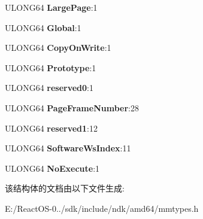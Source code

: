 \begin{DoxyCompactItemize}
U\+L\+O\+N\+G64 {\bfseries Large\+Page}\+:1
\item 
\mbox{\label{struct___h_a_r_d_w_a_r_e___p_t_e_ad8338907d10d3f0af79db8cd8588b9ef}} 
U\+L\+O\+N\+G64 {\bfseries Global}\+:1
\item 
\mbox{\label{struct___h_a_r_d_w_a_r_e___p_t_e_af6295815db74a2336e9915fe3067b23a}} 
U\+L\+O\+N\+G64 {\bfseries Copy\+On\+Write}\+:1
\item 
\mbox{\label{struct___h_a_r_d_w_a_r_e___p_t_e_adc0650db62e17a9f49a019897c7eb63b}} 
U\+L\+O\+N\+G64 {\bfseries Prototype}\+:1
\item 
\mbox{\label{struct___h_a_r_d_w_a_r_e___p_t_e_a4d9d87aa19f85084099858809b924767}} 
U\+L\+O\+N\+G64 {\bfseries reserved0}\+:1
\item 
\mbox{\label{struct___h_a_r_d_w_a_r_e___p_t_e_a9b4876b54ff1c9a5da0b5c8166dc3276}} 
U\+L\+O\+N\+G64 {\bfseries Page\+Frame\+Number}\+:28
\item 
\mbox{\label{struct___h_a_r_d_w_a_r_e___p_t_e_aae1849118a9af86e610a379231decf78}} 
U\+L\+O\+N\+G64 {\bfseries reserved1}\+:12
\item 
\mbox{\label{struct___h_a_r_d_w_a_r_e___p_t_e_ae06e551d4be34635fb7c3bfce37ad2cf}} 
U\+L\+O\+N\+G64 {\bfseries Software\+Ws\+Index}\+:11
\item 
\mbox{\label{struct___h_a_r_d_w_a_r_e___p_t_e_adafc7f38a9c4f4c332b7508feca7ca22}} 
U\+L\+O\+N\+G64 {\bfseries No\+Execute}\+:1
\end{DoxyCompactItemize}


该结构体的文档由以下文件生成\+:\begin{DoxyCompactItemize}
\item 
E\+:/\+React\+O\+S-\/0../sdk/include/ndk/amd64/mmtypes.\+h\end{DoxyCompactItemize}
